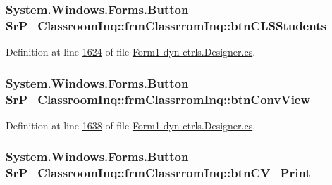 \hypertarget{class_sr_p___classroom_inq_1_1frm_classrrom_inq_a0aed8d1ecf711f52b3a948fdeae6ac5b}{
\subsubsection[{btn\-C\-L\-S\-Students}]{\setlength{\rightskip}{0pt plus 5cm}\-System.\-Windows.\-Forms.\-Button {\bf \-Sr\-P\-\_\-\-Classroom\-Inq\-::frm\-Classrrom\-Inq\-::btn\-C\-L\-S\-Students}}}
\label{class_sr_p___classroom_inq_1_1frm_classrrom_inq_a0aed8d1ecf711f52b3a948fdeae6ac5b}


\-Definition at line \hyperlink{_form1-dyn-ctrls_8_designer_8cs_source_l01624}{1624} of file \hyperlink{_form1-dyn-ctrls_8_designer_8cs_source}{\-Form1-\/dyn-\/ctrls.\-Designer.\-cs}.

\hypertarget{class_sr_p___classroom_inq_1_1frm_classrrom_inq_ab75b7c14e1f4b71b6513122c99dbe532}{
\subsubsection[{btn\-Conv\-View}]{\setlength{\rightskip}{0pt plus 5cm}\-System.\-Windows.\-Forms.\-Button {\bf \-Sr\-P\-\_\-\-Classroom\-Inq\-::frm\-Classrrom\-Inq\-::btn\-Conv\-View}}}
\label{class_sr_p___classroom_inq_1_1frm_classrrom_inq_ab75b7c14e1f4b71b6513122c99dbe532}


\-Definition at line \hyperlink{_form1-dyn-ctrls_8_designer_8cs_source_l01638}{1638} of file \hyperlink{_form1-dyn-ctrls_8_designer_8cs_source}{\-Form1-\/dyn-\/ctrls.\-Designer.\-cs}.

\hypertarget{class_sr_p___classroom_inq_1_1frm_classrrom_inq_aa974c0ec46e2bca7bea74774e0f460d4}{
\subsubsection[{btn\-C\-V\-\_\-\-Print}]{\setlength{\rightskip}{0pt plus 5cm}\-System.\-Windows.\-Forms.\-Button {\bf \-Sr\-P\-\_\-\-Classroom\-Inq\-::frm\-Classrrom\-Inq\-::btn\-C\-V\-\_\-\-Print}}}
\label{class_sr_p___classroom_inq_1_1frm_classrrom_inq_aa974c0ec46e2bca7bea74774e0f460d4}


